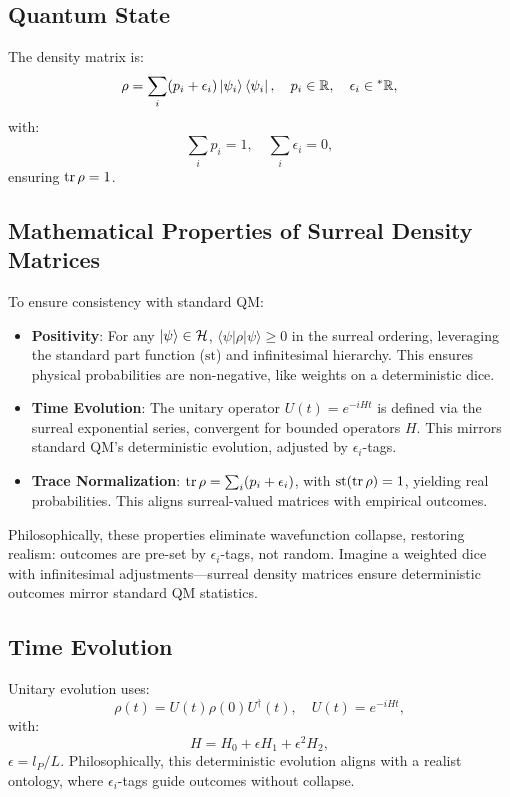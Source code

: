 \documentclass{article}
\begin{document}
\subsection{Quantum State}
The density matrix is:
\begin{equation}
\rho = \sum_i (p_i + \epsilon_i) \ket{\psi_i}\bra{\psi_i}, \quad p_i \in \mathbb{R}, \quad \epsilon_i \in {}^*\mathbb{R},
\end{equation}
with:
\begin{equation}
\sum_i p_i = 1, \quad \sum_i \epsilon_i = 0,
\end{equation}
ensuring \(\tr \rho = 1\).

\subsection{Mathematical Properties of Surreal Density Matrices}
To ensure consistency with standard QM:
\begin{itemize}
    \item \textbf{Positivity}: For any \(\ket{\psi} \in \mathcal{H}\), \(\langle \psi | \rho | \psi \rangle \geq 0\) in the surreal ordering, leveraging the standard part function (\(\text{st}\)) and infinitesimal hierarchy. This ensures physical probabilities are non-negative, like weights on a deterministic dice.
    \item \textbf{Time Evolution}: The unitary operator \(U(t) = e^{-i H t}\) is defined via the surreal exponential series, convergent for bounded operators \(H\). This mirrors standard QM's deterministic evolution, adjusted by \(\epsilon_i\)-tags.
    \item \textbf{Trace Normalization}: \(\tr \rho = \sum_i (p_i + \epsilon_i)\), with \(\text{st}(\tr \rho) = 1\), yielding real probabilities. This aligns surreal-valued matrices with empirical outcomes.
\end{itemize}

Philosophically, these properties eliminate wavefunction collapse, restoring realism: outcomes are pre-set by \(\epsilon_i\)-tags, not random. Imagine a weighted dice with infinitesimal adjustments—surreal density matrices ensure deterministic outcomes mirror standard QM statistics.

\subsection{Time Evolution}
Unitary evolution uses:
\begin{equation}
\rho(t) = U(t) \rho(0) U^\dagger(t), \quad U(t) = e^{-i H t},
\end{equation}
with:
\begin{equation}
H = H_0 + \epsilon H_1 + \epsilon^2 H_2,
\end{equation}
\(\epsilon = l_P / L\). Philosophically, this deterministic evolution aligns with a realist ontology, where \(\epsilon_i\)-tags guide outcomes without collapse.
\end{document}
